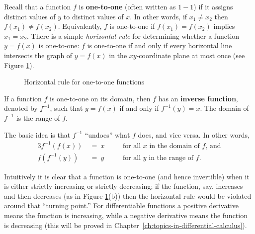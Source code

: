 Recall that a function $f$ is \textbf{one-to-one} (often
written as $1-1$) if it assigns distinct values of $y$ to distinct values of
$x$. In other words, if $x_1 \ne x_2$ then $f(x_1 ) \ne f(x_2 )$. Equivalently,
$f$ is one-to-one if $f(x_1 ) = f(x_2 )$ implies $x_1 = x_2$. There is a simple
\emph{horizontal rule} for determining whether a function $y=f(x)$ is
one-to-one: $f$ is one-to-one if and only if every horizontal line intersects
the graph of $y=f(x)$ in the $xy$-coordinate plane at most once (see
Figure \ref{fig:horizontalrule}).
\newpage
\begin{figure}[h]
 \centering
 \qquad\qquad
 \vspace{-2mm}
 \caption[]{\quad Horizontal rule for one-to-one functions}
 \label{fig:horizontalrule}
\end{figure}

If a function $f$ is one-to-one on its domain, then $f$ has an
\textbf{inverse function}, denoted by $f^{-1}$, such that $y=f(x)$ if and only
if $f^{-1}(y) = x$. The domain of $f^{-1}$ is the range of
$f$.

The basic idea is that $f^{-1}$ ``undoes'' what $f$ does, and vice versa. In
other words,
\begin{alignat*}{3}
 f^{-1}(f(x)) ~&=~ x \quad&&\text{for all $x$ in the domain of $f$, and}\\
 f(f^{-1}(y)) ~&=~ y \quad&&\text{for all $y$ in the range of $f$.}
\end{alignat*}

Intuitively it is clear that a function is one-to-one (and hence invertible)
when it is either strictly increasing or strictly decreasing; if the function,
say, increases and then decreases (as in Figure \ref{fig:horizontalrule}(b))
then the horizontal rule would be violated around that ``turning point.'' For
differentiable functions a positive derivative means the function is increasing,
while a negative derivative means the function is decreasing (this will be
proved in Chapter~\ref{ch:topics-in-differential-calculus}).

